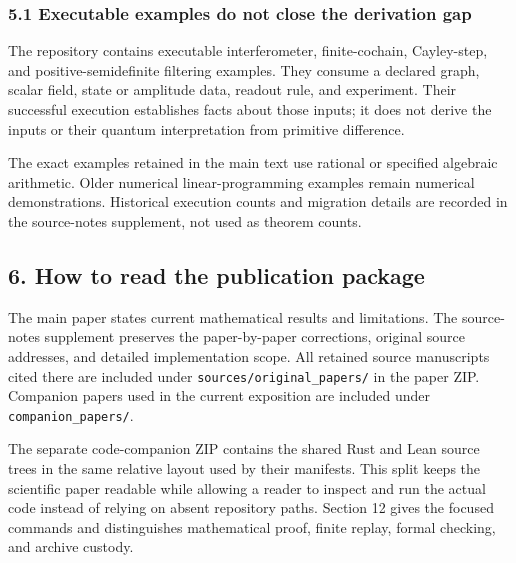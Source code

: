 \documentclass[
  11pt,
]{article}
\begin{document}
\subsubsection{5.1 Executable examples do not close the derivation
gap}\label{executable-examples-do-not-close-the-derivation-gap}

The repository contains executable interferometer, finite-cochain,
Cayley-step, and positive-semidefinite filtering examples. They consume
a declared graph, scalar field, state or amplitude data, readout rule,
and experiment. Their successful execution establishes facts about those
inputs; it does not derive the inputs or their quantum interpretation
from primitive difference.

The exact examples retained in the main text use rational or specified
algebraic arithmetic. Older numerical linear-programming examples remain
numerical demonstrations. Historical execution counts and migration
details are recorded in the source-notes supplement, not used as theorem
counts.

\subsection{6. How to read the publication
package}\label{how-to-read-the-publication-package}

The main paper states current mathematical results and limitations. The
source-notes supplement preserves the paper-by-paper corrections,
original source addresses, and detailed implementation scope. All
retained source manuscripts cited there are included under
\texttt{s\allowbreak{}o\allowbreak{}u\allowbreak{}r\allowbreak{}c\allowbreak{}e\allowbreak{}s\allowbreak{}/\allowbreak{}o\allowbreak{}r\allowbreak{}i\allowbreak{}g\allowbreak{}i\allowbreak{}n\allowbreak{}a\allowbreak{}l\allowbreak{}\_\allowbreak{}p\allowbreak{}a\allowbreak{}p\allowbreak{}e\allowbreak{}r\allowbreak{}s\allowbreak{}/}
in the paper ZIP. Companion papers used in the current exposition are
included under
\texttt{c\allowbreak{}o\allowbreak{}m\allowbreak{}p\allowbreak{}a\allowbreak{}n\allowbreak{}i\allowbreak{}o\allowbreak{}n\allowbreak{}\_\allowbreak{}p\allowbreak{}a\allowbreak{}p\allowbreak{}e\allowbreak{}r\allowbreak{}s\allowbreak{}/}.

The separate code-companion ZIP contains the shared Rust and Lean source
trees in the same relative layout used by their manifests. This split
keeps the scientific paper readable while allowing a reader to inspect
and run the actual code instead of relying on absent repository paths.
Section 12 gives the focused commands and distinguishes mathematical
proof, finite replay, formal checking, and archive custody.
\end{document}
